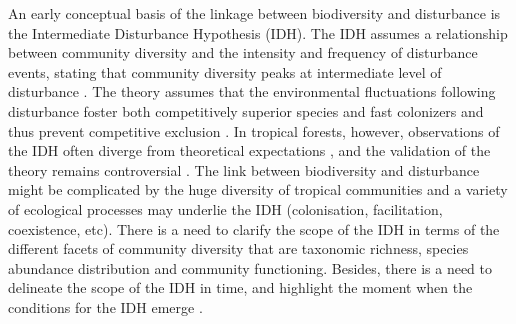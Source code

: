 \documentclass[fleqn,10pt]{ArtEcoFoG} %
\begin{document}
An early conceptual basis of the linkage between biodiversity and
disturbance is the Intermediate Disturbance Hypothesis (IDH). The IDH
assumes a relationship between community diversity and the intensity and
frequency of disturbance events, stating that community diversity peaks
at intermediate level of disturbance \citep{Connell1978}. The theory
assumes that the environmental fluctuations following disturbance foster
both competitively superior species and fast colonizers and thus prevent
competitive exclusion \citep{Shea2004, Pulsford2016}. In tropical
forests, however, observations of the IDH often diverge from theoretical
expectations \citep{Hugues2007, Sheil2003, Norden2017}, and the
validation of the theory remains controversial
\citep{Hubbell2001, Fox2013, Sheil2013}. The link between biodiversity
and disturbance might be complicated by the huge diversity of tropical
communities and a variety of ecological processes may underlie the IDH
(colonisation, facilitation, coexistence,
etc)\citep{Lindenmayer2012, Garcia_florez2017}. There is a need to
clarify the scope of the IDH in terms of the different facets of
community diversity that are taxonomic richness, species abundance
distribution and community functioning. Besides, there is a need to
delineate the scope of the IDH in time, and highlight the moment when
the conditions for the IDH emerge \citep{Sheil2003, Shea2004}.
\end{document}
